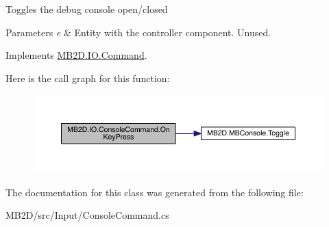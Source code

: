 Toggles the debug console open/closed 


\begin{DoxyParams}{Parameters}
{\em e} & Entity with the controller component. Unused.\\
\hline
\end{DoxyParams}


Implements \hyperlink{class_m_b2_d_1_1_i_o_1_1_command_ae927e36c0e285848325cc68eddb5fd72}{M\+B2\+D.\+I\+O.\+Command}.

Here is the call graph for this function\+:\nopagebreak
\begin{figure}[H]
\begin{center}
\leavevmode
\includegraphics[width=350pt]{class_m_b2_d_1_1_i_o_1_1_console_command_ad46e036e534b3b1cd1503782042d358f_cgraph}
\end{center}
\end{figure}


The documentation for this class was generated from the following file\+:\begin{DoxyCompactItemize}
\item 
M\+B2\+D/src/\+Input/Console\+Command.\+cs\end{DoxyCompactItemize}
